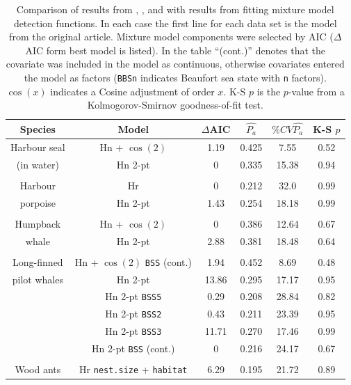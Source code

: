 \documentclass[useAMS,referee,usenatbib]{biom}
\begin{document}
\begin{table}
\caption[]{Comparison of results from , ,  and  with results from fitting mixture model detection functions. In each case the first line for each data set is the model from the original article. Mixture model components were selected by AIC ($\Delta$AIC form best model is listed). In the table ``(cont.)'' denotes that the covariate was included in the model as continuous, otherwise covariates entered the model as factors (\texttt{BBSn} indicates Beaufort sea state with \texttt{n} factors). $\cos(x)$ indicates a Cosine adjustment of order $x$. K-S $p$ is the $p$-value from a Kolmogorov-Smirnov goodness-of-fit test.}
\centering
\begin{tabular}{c c c c c c}
\hline \hline
Species & Model & $\Delta$AIC & $\hat{P_a}$ & $\% CV \hat{P_a}$ & K-S $p$\\
\hline
Harbour seal & Hn + $\cos(2)$ & 1.19 & 0.425 & 7.55 & 0.52\\
(in water) & Hn 2-pt  & 0 & 0.335 & 15.38 & 0.94\\
&&&&&\\
Harbour & Hr  & 0 & 0.212 & 32.0 & 0.99\\
porpoise & Hn 2-pt & 1.43 & 0.254 & 18.18 & 0.99\\
&&&&&\\
Humpback & Hn + $\cos(2)$ & 0 & 0.386 & 12.64 & 0.67 \\
whale & Hn 2-pt & 2.88 & 0.381 & 18.48 & 0.64 \\
&&&&&\\
Long-finned & Hn + $\cos(2)$ \texttt{BSS} (cont.) & 1.94 & 0.452 & 8.69 & 0.48\\ %
pilot whales  & Hn 2-pt          &  13.86  &  0.295  &  17.17  &  0.95 \\
 & Hn 2-pt \texttt{BSS5}         &  0.29   &  0.208  &  28.84  &  0.82 \\
 & Hn 2-pt  \texttt{BSS2}        &  0.43  &  0.211  &  23.39  &  0.95 \\
 & Hn 2-pt  \texttt{BSS3}        &  11.71 &  0.270  &  17.46  &  0.99 \\
 & Hn 2-pt  \texttt{BSS} (cont.) & 0  &  0.216  &  24.17  &  0.67 \\
 &&&&&\\
Wood ants & Hr \texttt{nest.size} + \texttt{habitat} & 6.29 & 0.195  & 21.72 & 0.89\\ %

\end{tabular}
\end{table}
\end{document}
